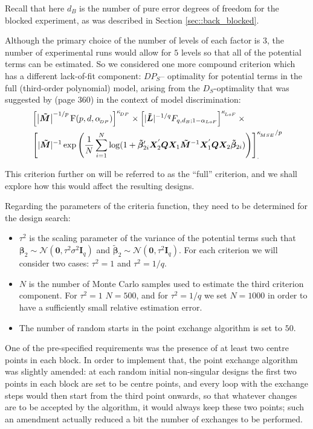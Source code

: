 Recall that here $d_B$ is the number of pure error degrees of freedom for the blocked experiment, as was described in Section \ref{sec::back_blocked}. 

Although the primary choice of the number of levels of each factor is $3$, the number of experimental runs would allow for $5$ levels so that all of the potential terms can be estimated. So we considered one more compound criterion which has a different lack-of-fit component: $DP_S$-- optimality for potential terms in the full (third-order polynomial) model, arising from the $D_S$-optimality that was suggested by \cite{Atkinson2007} (page $360$) in the context of model discrimination:
\begin{align}
\label{eq::crit2}
&\left[\left|\bm{\tilde{M}}\right|^{-1/p}\mathrm{F}(p,d,\alpha_{\!_{DP}})\right]^{\kappa_{\!_{DP}}} \times  \left[|\bm{\tilde{L}}|^{-1/q}F_{q,d_B;1-\alpha_{LoF}}\right]^{\kappa_{\!_{LoF}}}\times \notag\\ & \left[|\bm{\tilde{M}}|^{-1}\exp\left(\frac{1}{N}\sum_{i=1}^{N}\log(1+\bm{\tilde{\beta}}_{2i}'\bm{X}_2^{'}\bm{Q}\bm{X}_1\bm{\tilde{M}}^{-1}\bm{X}_1^{'}\bm{Q}\bm{X}_2\bm{\tilde{\beta}}_{2i})\right)\right]_{.}^{\kappa_{\!_{MSE}}/p}
\end{align}

This criterion further on will be referred to as the ``full'' criterion, and we shall explore how this would affect the resulting designs.

Regarding the parameters of the criteria function, they need to be determined for the design search:
\begin{itemize}
\item $\tau^2$ is the scaling parameter of the variance of the potential terms such that $\bm{\beta}_2\sim \mathcal{N}(\bm{0},\tau^{2}\sigma^{2}\bm{I}_{q})$ and $\bm{\tilde{\beta}}_2\sim \mathcal{N}(\bm{0},\tau^{2}\bm{I}_{q})$. For each criterion we will consider two cases: $\tau^2=1$ and $\tau^2=1/q$. 
\item $N$ is the number of Monte Carlo samples used to estimate the third criterion component. For $\tau^2=1$ $N=500$, and for $\tau^2=1/q$ we set $N=1000$ in order to have a sufficiently small relative estimation error.
\item The number of random starts in the point exchange algorithm is set to $50$.  
\end{itemize}

One of the pre-specified requirements was the presence of at least two centre points in each block. In order to implement that, the point exchange algorithm was slightly amended: at each random initial non-singular designs the first two points in each block are set to be centre points, and every loop with the exchange steps would then start from the third point onwards, so that whatever changes are to be accepted by the algorithm, it would always keep these two points; such an amendment  actually reduced a bit the number of exchanges to be performed. 


